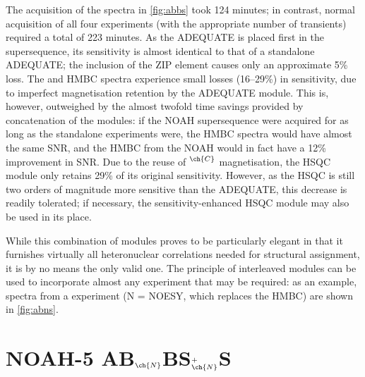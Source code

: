 \documentclass[a4paper,12pt]{article}
\newcommand{\carbon}{\ch{^{13}C}}
\newcommand{\nitrogen}{\ch{^{15}N}}
\newcommand{\magn}[1]{\ch{^1H}$^{#1}$}
\newcommand{\changed}[1]{{\color{DodgerBlue!75!blue}#1}}
\begin{document}
\begin{refsection}
\changed{
The acquisition of the  spectra in \cref{fig:abbs} took 124 minutes; in contrast, normal acquisition of all four experiments (with the appropriate number of transients) required a total of 223 minutes.
As the ADEQUATE is placed first in the supersequence, its sensitivity is almost identical to that of a standalone ADEQUATE; the inclusion of the ZIP element causes only an approximate 5\% loss.
The \nitrogen{} and \carbon{} HMBC spectra experience small losses (16--29\%) in sensitivity, due to imperfect magnetisation retention by the ADEQUATE module.
This is, however, outweighed by the almost twofold time savings provided by concatenation of the modules: if the NOAH supersequence were acquired for as long as the standalone experiments were, the \nitrogen{} HMBC spectra would have almost the same SNR, and the \carbon{} HMBC from the NOAH would in fact have a 12\% improvement in SNR.
Due to the reuse of \magn{\ch{C}} magnetisation, the HSQC module only retains 29\% of its original sensitivity.
However, as the HSQC is still two orders of magnitude more sensitive than the ADEQUATE, this decrease is readily tolerated; if necessary, the sensitivity-enhanced HSQC module\autocite{Palmer1991JMR,Kay1992JACS,Hansen2021AC,Yong2021JMR} may also be used in its place.

While this combination of modules proves to be particularly elegant in that it furnishes virtually all heteronuclear correlations needed for structural assignment, it is by no means the only valid one.
The principle of interleaved modules can be used to incorporate almost any experiment that may be required: as an example, spectra from a \noah{A,Bn,N,S} experiment (N = NOESY, which replaces the \carbon{} HMBC) are shown in \cref{fig:abns}.
}

\section{NOAH-5 AB\texorpdfstring{$_{\ch{N}}$}{n}BS\texorpdfstring{$^+_{\ch{N}}$}{+n}S}


\end{refsection}
\end{document}
